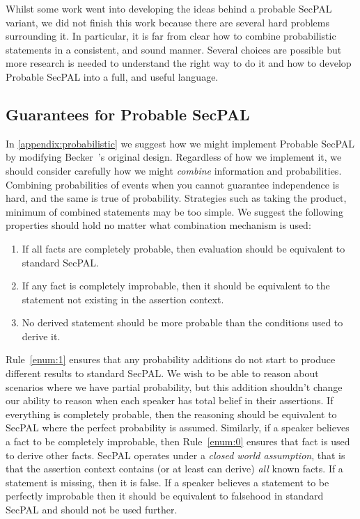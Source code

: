 \documentclass[thesis.tex]{subfiles}
\begin{document}
Whilst some work went into developing the ideas behind a probable SecPAL
variant, we did not finish this work because there are several hard problems
surrounding it. In particular, it is far from clear how to combine probabilistic
statements in a consistent, and sound manner. Several choices are possible but
more research is needed to understand the right way to do it and how to develop
Probable SecPAL into a full, and useful language.


\subsection{Guarantees for Probable SecPAL} 

In \autoref{appendix:probabilistic} we suggest how we might implement
Probable SecPAL by modifying Becker~\etal's original
design. Regardless of how we implement it, we should consider
carefully how we might \emph{combine} information and
probabilities. Combining probabilities of events when you cannot
guarantee independence is hard, and the same is true of
probability. Strategies such as taking the product, minimum of
combined statements may be too simple. We suggest the following
properties should hold no matter what combination mechanism is used:

\begin{enumerate}
\item \label{enum:1} If all facts are completely probable, then evaluation should be
  equivalent to standard SecPAL.
\item \label{enum:0} If any fact is completely  improbable, then it should be equivalent
  to the statement not existing in the assertion context.
\item \label{enum:grow} No derived statement should be more probable than the conditions used
  to derive it.
\end{enumerate}

Rule~\ref{enum:1} ensures that any probability additions do not start to
produce different results to standard SecPAL. We wish to be able to reason about
scenarios where we have partial probability, but this addition shouldn't change
our ability to reason when each speaker has total belief in their assertions. If
everything is completely probable, then the reasoning should be equivalent to
SecPAL where the perfect probability is assumed. Similarly, if a speaker
believes a fact to be completely improbable, then Rule~\ref{enum:0} ensures that
fact is used to derive other facts. SecPAL operates under a \emph{closed world
assumption}, that is that the assertion context contains (or at least can
derive) \emph{all} known facts. If a statement is missing, then it is false. If a
speaker believes a statement to be perfectly improbable then it should be
equivalent to falsehood in standard SecPAL and should not be used further.
\end{document}
